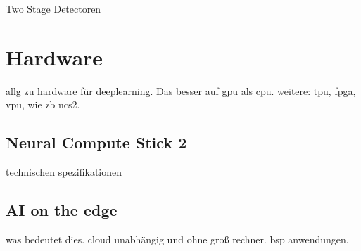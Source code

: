 Two Stage Detectoren


\section{Hardware}\label{sec:hardware}


allg zu hardware für deeplearning. Das besser auf gpu als cpu. weitere: tpu, fpga, vpu, wie zb ncs2.

\subsection{Neural Compute Stick 2}

technischen spezifikationen





\subsection{AI on the edge}

was bedeutet dies. cloud unabhängig und ohne groß rechner. bsp anwendungen.

